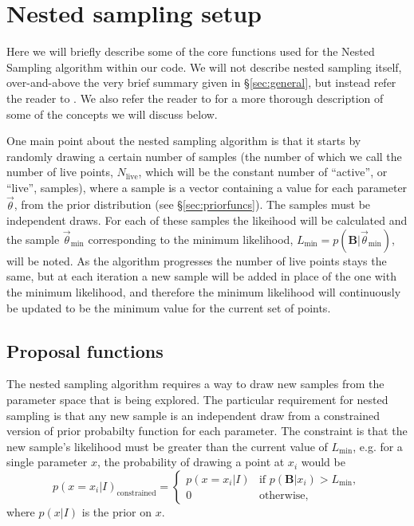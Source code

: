 \section{Nested sampling setup}

Here we will briefly describe some of the core functions used for the Nested Sampling algorithm within our code. We will
not describe nested sampling itself, over-and-above the very brief summary given in \S\ref{sec:general}, but instead refer
the reader to \citet{Veitch:2010}. We also refer the reader to \citet{2015PhRvD..91d2003V} for a more thorough description
of some of the concepts we will discuss below.

One main point about the nested sampling algorithm is that it starts by randomly drawing a certain number of samples (the number of
which we call the number of live points, $N_{\text{live}}$, which will be the constant number of ``active'', or ``live'', samples),  
where a sample is a vector containing a value for each parameter $\vec{\theta}$, from the prior distribution (see \S\ref{sec:priorfuncs}).
The samples must be independent draws. For each of these samples the likeihood will be calculated and the sample $\vec{\theta}_{\text{min}}$
corresponding to the minimum likelihood, $L_{\text{min}} = p(\mathbf{B}|\vec{\theta}_{\text{min}})$, will be noted. As the algorithm
progresses the number of live points stays the
same, but at each iteration a new sample will be added in place of the one with the minimum likelihood, and therefore the
minimum likelihood will continuously be updated to be the minimum value for the current set of points.

\subsection{Proposal functions}\label{sec:proposals}

The nested sampling algorithm requires a way to draw new samples from the parameter space that is being explored. The
particular requirement for nested sampling is that any new sample is an independent draw from a constrained version
of prior probabilty function for each parameter. The constraint is that the new sample's likelihood must be greater
than the current value of $L_{\text{min}}$, e.g. for a single parameter $x$, the probability of drawing a point at $x_i$ 
would be
\begin{equation}
 p(x=x_i|I)_{\text{constrained}} = \begin{cases}
             p(x=x_i|I) & \text{if~} p(\mathbf{B}|x_i) > L_{\text{min}}, \\
             0 & \text{otherwise},
            \end{cases}
\end{equation}
where $p(x|I)$ is the prior on $x$.

